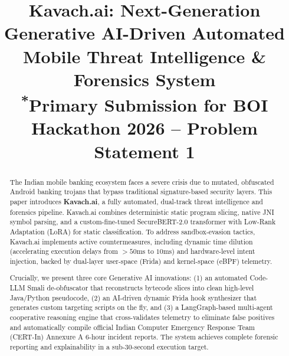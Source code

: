 \documentclass[conference]{IEEEtran}
\begin{document}
\title{Kavach.ai: Next-Generation Generative AI-Driven Automated Mobile Threat Intelligence \& Forensics System\\
{\footnotesize \textsuperscript{*}Primary Submission for BOI Hackathon 2026 -- Problem Statement 1}
}

\author{
\and
{}
\and
{}
\and
{}
}

\maketitle

\begin{abstract}
The Indian mobile banking ecosystem faces a severe crisis due to mutated, obfuscated Android banking trojans that bypass traditional signature-based security layers. This paper introduces \textbf{Kavach.ai}, a fully automated, dual-track threat intelligence and forensics pipeline. Kavach.ai combines deterministic static program slicing, native JNI symbol parsing, and a custom-fine-tuned SecureBERT-2.0 transformer with Low-Rank Adaptation (LoRA) for static classification. To address sandbox-evasion tactics, Kavach.ai implements active countermeasures, including dynamic time dilution (accelerating execution delays from $>50\text{ms}$ to $10\text{ms}$) and hardware-level intent injection, backed by dual-layer user-space (Frida) and kernel-space (eBPF) telemetry. 

Crucially, we present three core Generative AI innovations: (1) an automated Code-LLM Smali de-obfuscator that reconstructs bytecode slices into clean high-level Java/Python pseudocode, (2) an AI-driven dynamic Frida hook synthesizer that generates custom targeting scripts on the fly, and (3) a LangGraph-based multi-agent cooperative reasoning engine that cross-validates telemetry to eliminate false positives and automatically compile official Indian Computer Emergency Response Team (CERT-In) Annexure A 6-hour incident reports. The system achieves complete forensic reporting and explainability in a sub-30-second execution target.
\end{abstract}
\end{document}
